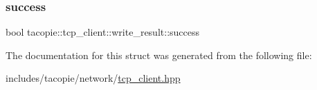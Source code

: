 \mbox{\label{structtacopie_1_1tcp__client_1_1write__result_a4a8d5706c83068a97c10e63c6080e6a3}} 
\subsubsection{\texorpdfstring{success}{success}}
{\footnotesize\ttfamily bool tacopie\+::tcp\+\_\+client\+::write\+\_\+result\+::success}



The documentation for this struct was generated from the following file\+:\begin{DoxyCompactItemize}
\item 
includes/tacopie/network/\hyperlink{tcp__client_8hpp}{tcp\+\_\+client.\+hpp}\end{DoxyCompactItemize}
